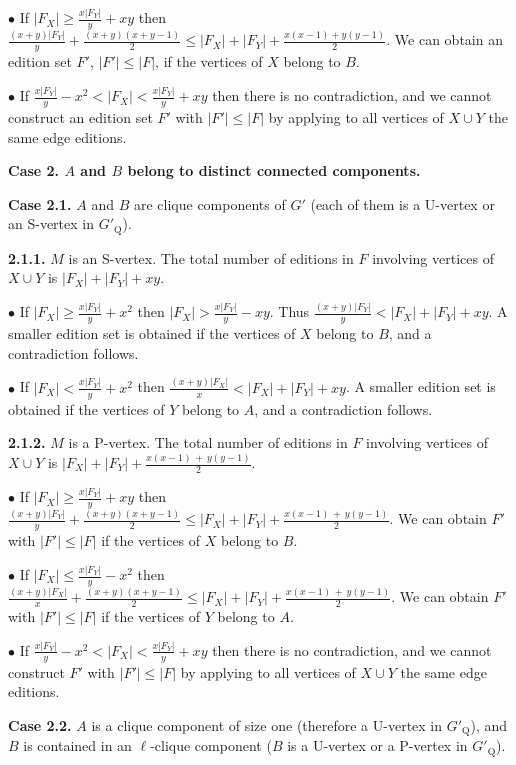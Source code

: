 \documentclass[12pt]{article}
\begin{document}
$\bullet$ If $|F_X|\geq \frac{x|F_Y|}{y}+ xy$ then
$\frac{(x+y)|F_Y|}{y}+ \frac{(x+y)(x+y-1)}{2}\leq |F_X| + |F_Y| +
\frac{x(x-1)+y(y-1)}{2}$. We can obtain an edition set $F'$,
$|F'|\leq|F|$, if the vertices of $X$ belong to $B$.

$\bullet$ If $\frac{x|F_Y|}{y}-x^2 < |F_X|< \frac{x|F_Y|}{y}+ xy$ then there is no contradiction,
and we cannot construct an edition set $F'$ with $|F'| \leq |F|$ by applying to all vertices
of $X \cup Y$ the same edge editions.


\textbf{Case 2. $A$ and $B$ belong to distinct connected
components.}

\textbf{Case 2.1.} $A$ and $B$ are clique components of $G'$ (each of them is a U-vertex or an S-vertex in $G'_{\mathrm Q}$).

\textbf{2.1.1.} $M$ is an S-vertex. The total number of editions in
$F$ involving vertices of $X \cup Y$ is $|F_X|+|F_Y|+ xy$.

$\bullet$ If $|F_X|\geq \frac{x |F_Y|}{y} + x^2$ then $|F_X|>
\frac{x |F_Y|}{y}- xy$. Thus $\frac{(x+y)|F_Y|}{y}< |F_X| + |F_Y|
+ xy$.  A smaller edition set is obtained if the vertices of
$X$ belong to $B$, and a contradiction follows.

$\bullet$ If $|F_X|< \frac{x |F_Y|}{y} + x^2$ then
$\frac{(x+y)|F_X|}{x}< |F_X| + |F_Y| + xy$. A smaller edition set is obtained if the vertices of $Y$ belong to $A$, and a
contradiction follows.

\textbf{2.1.2.} $M$ is a P-vertex. The total number of editions in
$F$ involving vertices of $X \cup Y$ is
$|F_X|+|F_Y|+\frac{x(x-1)\, +\, y(y-1)}{2}$.

$\bullet$ If $|F_X| \geq \frac{x |F_Y|}{y}+ xy$ then
$\frac{(x+y)|F_Y|}{y}+ \frac{(x+y)(x+y-1)}{2} \leq |F_X| + |F_Y| +
\frac{x(x-1)\, +\, y(y-1)}{2}$. We can obtain $F'$ with $|F'|\leq
|F|$ if the vertices of $X$ belong to $B$.

$\bullet$ If $|F_X|\leq \frac{x |F_Y|}{y}- x^2$ then
$\frac{(x+y)|F_X|}{x}+ \frac{(x+y)(x+y-1)}{2} \leq |F_X| + |F_Y| +
\frac{x(x-1)\, +\, y(y-1)}{2}$. We can obtain $F'$ with $|F'|\leq
|F|$ if the vertices of $Y$ belong to $A$.

$\bullet$ If $ \frac{x |F_Y|}{y}- x^2 < |F_X| < \frac{x |F_Y|}{y}+
xy$ then there is no contradiction, and we cannot construct $F'$
with $|F'| \leq |F|$ by applying to all vertices of $X \cup Y$ the
same edge editions.

\textbf{Case 2.2.} $A$ is a clique component of size one
(therefore a U-vertex in $G'_{\mathrm Q}$), and $B$ is contained
in an $\ell$-clique component ($B$ is a U-vertex or a P-vertex in
$G'_{\mathrm Q}$).
\end{document}

